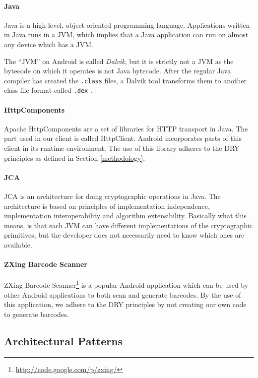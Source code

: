 \documentclass[pdftex,english,10pt,b5paper,twoside]{book}
\begin{document}
\paragraph{Java} Java is a high-level, object-oriented programming language.
Applications written in Java runs in a \ac{JVM}, which implies that a Java
application can run on almost any device which has a \ac{JVM}.

The ``\ac{JVM}'' on Android is called \emph{Dalvik}, but it is strictly not a
\acl{JVM} as the bytecode on which it operates is not Java bytecode.
After the regular Java compiler has created the \texttt{.class} files, a Dalvik
tool transforms them to another class file format called \texttt{.dex}
\cite{dalvik}.

\paragraph{HttpComponents} Apache HttpComponents are a set of libraries for
\ac{HTTP} transport in Java. The part used in our client is called HttpClient.
Android incorporates parts of this client in its runtime environment. The use
of this library adheres to the \ac{DRY} principles as defined in Section
\ref{methodology}.

\paragraph{\ac{JCA}} \ac{JCA} is an architecture for doing cryptographic
operations in Java. The architecture is based on principles of implementation
independence, implementation interoperability and algorithm extensibility.
Basically what this means, is that each \ac{JVM} can have different
implementations of the cryptographic primitives, but the developer does not
necessarily need to know which ones are available.

\paragraph{ZXing Barcode Scanner} ZXing Barcode Scanner\footnote
{\url{http://code.google.com/p/zxing/}} is a popular Android application which
can be used by other Android applications to both scan and generate barcodes.
By the use of this application, we adhere to the \ac{DRY} principles by not
creating our own code to generate barcodes.

\subsection{Architectural Patterns}
\end{document}
